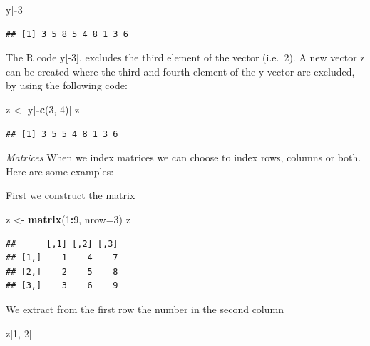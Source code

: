\documentclass[]{book}
\newenvironment{Shaded}{\begin{snugshade}}{\end{snugshade}}
\newcommand{\KeywordTok}[1]{\textcolor[rgb]{0.13,0.29,0.53}{\textbf{#1}}}
\newcommand{\DataTypeTok}[1]{\textcolor[rgb]{0.13,0.29,0.53}{#1}}
\newcommand{\DecValTok}[1]{\textcolor[rgb]{0.00,0.00,0.81}{#1}}
\newcommand{\StringTok}[1]{\textcolor[rgb]{0.31,0.60,0.02}{#1}}
\newcommand{\OperatorTok}[1]{\textcolor[rgb]{0.81,0.36,0.00}{\textbf{#1}}}
\newcommand{\NormalTok}[1]{#1}
\begin{document}
\begin{Shaded}
\begin{Highlighting}[]
\NormalTok{y[}\OperatorTok{-}\DecValTok{3}\NormalTok{]}
\end{Highlighting}
\end{Shaded}

\begin{verbatim}
## [1] 3 5 8 5 4 8 1 3 6
\end{verbatim}

The R code y{[}-3{]}, excludes the third element of the vector (i.e.~2).
A new vector z can be created where the third and fourth element of the
y vector are excluded, by using the following code:

\begin{Shaded}
\begin{Highlighting}[]
\NormalTok{z <-}\StringTok{ }\NormalTok{y[}\OperatorTok{-}\KeywordTok{c}\NormalTok{(}\DecValTok{3}\NormalTok{, }\DecValTok{4}\NormalTok{)]}
\NormalTok{z}
\end{Highlighting}
\end{Shaded}

\begin{verbatim}
## [1] 3 5 5 4 8 1 3 6
\end{verbatim}

\emph{Matrices} When we index matrices we can choose to index rows,
columns or both. Here are some examples:

First we construct the matrix

\begin{Shaded}
\begin{Highlighting}[]
\NormalTok{z <-}\StringTok{ }\KeywordTok{matrix}\NormalTok{(}\DecValTok{1}\OperatorTok{:}\DecValTok{9}\NormalTok{, }\DataTypeTok{nrow=}\DecValTok{3}\NormalTok{)}
\NormalTok{z}
\end{Highlighting}
\end{Shaded}

\begin{verbatim}
##      [,1] [,2] [,3]
## [1,]    1    4    7
## [2,]    2    5    8
## [3,]    3    6    9
\end{verbatim}

We extract from the first row the number in the second column

\begin{Shaded}
\begin{Highlighting}[]
\NormalTok{z[}\DecValTok{1}\NormalTok{, }\DecValTok{2}\NormalTok{]}
\end{Highlighting}
\end{Shaded}
\end{document}
